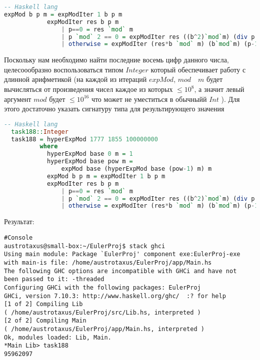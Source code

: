 \documentclass[11pt,a4paper]{article}
\begin{document}
\begin{lstlisting}[language=Haskell]
-- Haskell lang
expMod b p m = expModIter 1 b p m
            expModIter res b p m
                | p==0 = res `mod` m
                | p `mod` 2 == 0 = expModIter res ((b^2)`mod`m) (div p 2) m
                | otherwise = expModIter (res*b `mod` m) (b`mod`m) (p-1) m
\end{lstlisting}

Поскольку нам необходимо найти последние восемь цифр данного числа, целесоообразно воспользоваться типом $Integer$ который обеспечивает работу с длинной арифметикой (на каждой из итераций $expMod$, $mod \quad m$ будет вычисляться от произведения чисел каждое из которых $\le  10^8$, а значит левый аргумент $mod$ будет $\le  10^{16}$ что может не уместиться в обычныйй $Int$ ). Для этого достаточно указать сигнатуру типа для результирующего значения
\begin{lstlisting}[language=Haskell]
  -- Haskell lang
  task188::Integer
  task188 = hyperExpMod 1777 1855 100000000
          where
            hyperExpMod base 0 m = 1
            hyperExpMod base pow m =
                expMod base (hyperExpMod base (pow-1) m) m
            expMod b p m = expModIter 1 b p m
            expModIter res b p m
                | p==0 = res `mod` m
                | p `mod` 2 == 0 = expModIter res ((b^2)`mod`m) (div p 2) m
                | otherwise = expModIter (res*b `mod` m) (b`mod`m) (p-1) m

\end{lstlisting}
Результат:
\begin{lstlisting}
#Console
austrotaxus@small-box:~/EulerProj$ stack ghci
Using main module: Package `EulerProj' component exe:EulerProj-exe
with main-is file: /home/austrotaxus/EulerProj/app/Main.hs
The following GHC options are incompatible with GHCi and have not
been passed to it: -threaded
Configuring GHCi with the following packages: EulerProj
GHCi, version 7.10.3: http://www.haskell.org/ghc/  :? for help
[1 of 2] Compiling Lib
( /home/austrotaxus/EulerProj/src/Lib.hs, interpreted )
[2 of 2] Compiling Main
( /home/austrotaxus/EulerProj/app/Main.hs, interpreted )
Ok, modules loaded: Lib, Main. 
*Main Lib> task188
95962097
\end{lstlisting}
\end{document}
